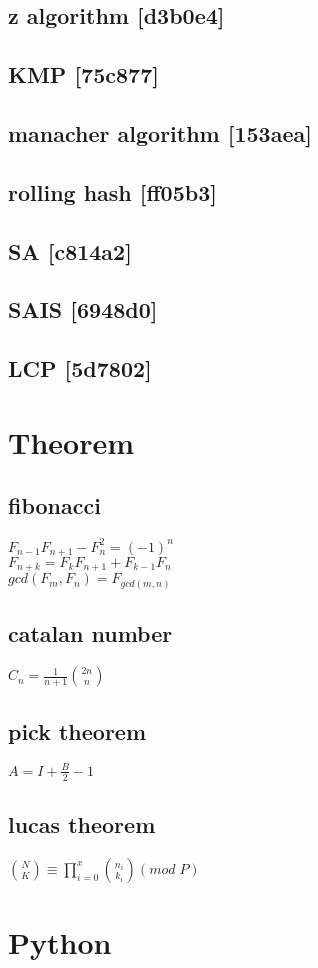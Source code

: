 \subsection{z algorithm {\footnotesize [d3b0e4]} }

\subsection{KMP {\footnotesize [75c877]} }

\subsection{manacher algorithm {\footnotesize [153aea]} }

\subsection{rolling hash {\footnotesize [ff05b3]} }

\subsection{SA {\footnotesize [c814a2]} }

\subsection{SAIS {\footnotesize [6948d0]} }

\subsection{LCP {\footnotesize [5d7802]} }


\section{Theorem}
\doublespacing
\subsection{fibonacci}
\mbox{\Large\(F_{n-1} F_{n+1} - F_n^2 = (-1)^n\)}\\
\mbox{\Large\(F_{n+k} = F_k F_{n+1} + F_{k-1} F_n\)}\\
\mbox{\Large\(gcd(F_m, F_n) = F_{gcd(m, n)}\)}
\subsection{catalan number}
\mbox{\Large\(C_n = \frac{1}{n + 1} \binom{2n}{n}\)}
\subsection{pick theorem}
\mbox{\Large\(A=I+\frac{B}{2}-1\)}
\subsection{lucas theorem}
\mbox{\Large\(\binom{N}{K} \equiv \prod_{i=0}^{x}\binom{n_i}{k_i} (mod\;P)\)}
\singlespacing

\section{Python}


